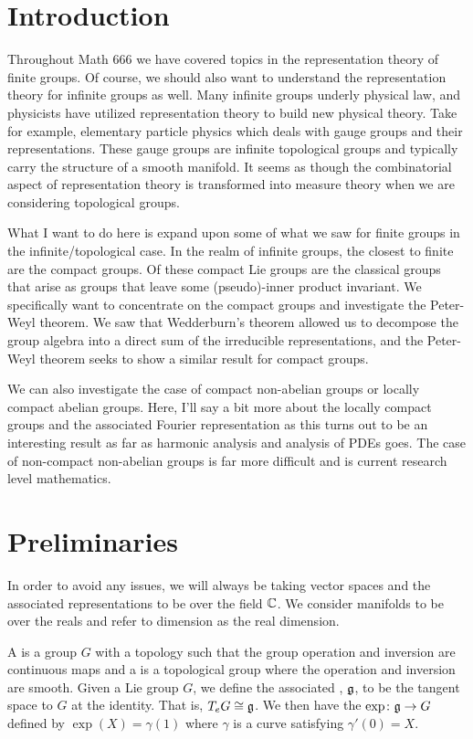 \section{Introduction}
Throughout Math 666 we have covered topics in the representation theory of finite groups.  Of course, we should also want to understand the representation theory for infinite groups as well.  Many infinite groups underly physical law, and physicists have utilized representation theory to build new physical theory.  Take for example, elementary particle physics which deals with gauge groups and their representations. These gauge groups are infinite topological groups and typically carry the structure of a smooth manifold.  It seems as though the combinatorial aspect of representation theory is transformed into measure theory when we are considering topological groups.  

What I want to do here is expand upon some of what we saw for finite groups in the infinite/topological case.  In the realm of infinite groups, the closest to finite are the compact groups. Of these compact Lie groups are the classical groups that arise as groups that leave some (pseudo)-inner product invariant.  We specifically want to concentrate on the compact groups and investigate the Peter-Weyl theorem. We saw that Wedderburn's theorem allowed us to decompose the group algebra into a direct sum of the irreducible representations, and the Peter-Weyl theorem seeks to show a similar result for compact groups.

We can also investigate the case of compact non-abelian groups or locally compact abelian groups.  Here, I'll say a bit more about the locally compact groups and the associated Fourier representation as this turns out to be an interesting result as far as harmonic analysis and analysis of PDEs goes. The case of non-compact non-abelian groups is far more difficult and is current research level mathematics.

\section{Preliminaries}
In order to avoid any issues, we will always be taking vector spaces and the associated representations to be over the field $\mathbb{C}$. We consider manifolds to be over the reals and refer to dimension as the real dimension.  

A  is a group $G$ with a topology such that the group operation and inversion are continuous maps and a  is a topological group where the operation and inversion are smooth. Given a Lie group $G$, we define the associated , $\mathfrak{g}$, to be the tangent space to $G$ at the identity. That is, $T_eG\cong \mathfrak{g}$. We then have the  $\exp \colon \mathfrak{g} \to G$ defined by $\exp(X)=\gamma(1)$ where $\gamma$ is a curve satisfying $\gamma'(0)=X$. 

